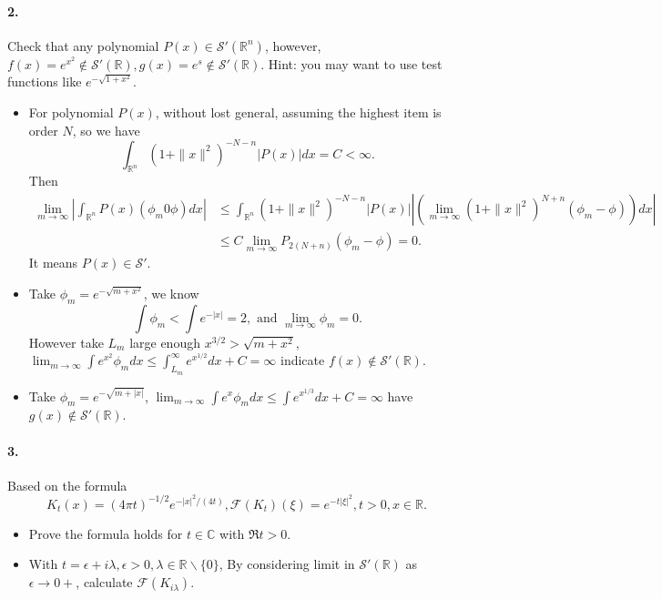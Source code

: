\documentclass[a4paper]{book}
\makeatletter
\newenvironment{sol}[1][\solname]{\par
  \pushQED{\qed}
  \normalfont \topsep6\p@\@plus6\p@\relax
  \trivlist
  \item[\hskip\labelsep
        \itshape
    #1\@addpunct{.}]\ignorespaces
}{\popQED\endtrivlist\@endpefalse}
\providecommand{\solname}{Solution}
\numberwithin{equation}{chapter}
\theoremstyle{definition}
\makeatother
\begin{document}
\paragraph*{2. }
Check that any polynomial $P(x) \in \mathcal{S}'(\mathbb{R}^n)$,
however, $f(x) = e^{x^2} \notin \mathcal{S}'(\mathbb{R}), 
g(x) = e^s \notin \mathcal{S}'(\mathbb{R})$. Hint: you may want
to use test functions like $e^{-\sqrt{1 +x^2}}$.
\begin{sol}
    \begin{itemize}
        \item For polynomial $P(x)$, without lost general, assuming 
        the highest item is order $N$, so we have 
        \[ \int_{\mathbb{R}^n} (1 + \| x\|^2)^{-N - n} |P(x)| dx = C < \infty.\]
        Then 
        \begin{align*}
            \lim_{m \rightarrow \infty}|\int_{\mathbb{R}^n} P(x) (\phi_m 0 \phi) dx | &\leq 
            \int_{\mathbb{R}^n} (1 + \|x\|^2)^{-N -n} |P(x)| |(\lim_{m \rightarrow \infty} (1 + \|x\|^2)^{N+n} (\phi_m - \phi) ) dx | \\
            &\leq C \lim_{m \rightarrow \infty} P_{2(N+n)}(\phi_m - \phi)
            =0.
        \end{align*}
        It means $P(x) \in \mathcal{S}'$.

        \item Take $\phi_m = e^{-\sqrt{m + x^2}}$, we know 
        \[ \int \phi_m < \int e^{-|x|} = 2, \text{ and } 
        \lim_{m \rightarrow \infty} \phi_m = 0.\]
        However take $L_m$ large enough $x^{3/2} > \sqrt{m + x^2}$, $\lim_{m \rightarrow \infty}\int e^{x^2} \phi_m dx 
        \leq \int_{L_m}^{\infty} e^{x^{1/2}} dx + C = \infty$ indicate $f(x) \notin \mathcal{S}'(\mathbb{R})$.

        \item Take $\phi_m = e^{-\sqrt{m + |x|}}$, $\lim_{m \rightarrow \infty}\int e^{x} \phi_m dx 
        \leq \int e^{x^{1/3}} dx + C = \infty$ have $g(x) \notin \mathcal{S}'(\mathbb{R})$.
    \end{itemize}
\end{sol}

\paragraph*{3. }
Based on the formula 
\[ K_t(x) = (4\pi t)^{-1/2} e^{-|x|^2 / (4t)}, \mathcal{F}
(K_t)(\xi ) = e^{-t |\xi |^2}, t > 0, x \in \mathbb{R}.\]
\begin{itemize}
    \item Prove the formula holds for $t \in \mathbb{C}$ 
    with $\mathfrak{R}t > 0$.

    \item With $t = \epsilon  + i\lambda, \epsilon > 0, 
    \lambda \in \mathbb{R} \backslash \{0\}$, By considering
    limit in $\mathcal{S}'(\mathbb{R})$ as $\epsilon \rightarrow
    0+$, calculate $\mathcal{F}(K_{i\lambda})$.
\end{itemize}
\end{document}
